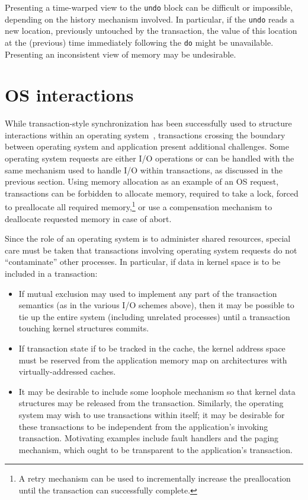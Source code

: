 Presenting a time-warped view to the \texttt{undo} block can be
difficult or impossible, depending on the history mechanism involved.
In particular, if the \texttt{undo} reads a new location, previously
untouched by the transaction, the value of this location at the
(previous) time immediately following the \texttt{do} might be
unavailable.  Presenting an inconsistent view of memory may be
undesirable.

\section{OS interactions}
While transaction-style synchronization has been successfully used to
structure interactions within an operating system~\cite{MassalinPu91},
transactions crossing the boundary between operating system and
application present additional challenges.  Some operating system
requests are either I/O operations or can be handled with the same
mechanism used to handle I/O within transactions, as discussed in the
previous section.  Using memory allocation as an example of an OS
request, transactions can be forbidden to allocate memory, required to
take a lock, forced to preallocate all required memory,\footnote{A
retry mechanism can be used to incrementally increase the
preallocation until the transaction can successfully complete.} or
use a compensation mechanism to deallocate requested memory in case of
abort.

Since the role of an operating system is to administer shared
resources, special care must be taken that transactions involving
operating system requests do not ``contaminate'' other processes.
In particular, if data in kernel space is to be included in a
transaction:
\begin{itemize}
\item If mutual exclusion may used to implement any part of the
transaction semantics (as in the various I/O schemes above), then it
may be possible to tie up the entire system (including unrelated
processes) until a transaction touching kernel structures commits.
\item If transaction state if to be tracked in the cache, the
kernel address space must be reserved from the application memory map
 on architectures with virtually-addressed caches.
\item It may be desirable to include some loophole mechanism
 so that kernel data structures may be released from the transaction.
 Similarly, the operating system may wish to use transactions within
 itself; it may be desirable for these transactions to be independent
 from the application's invoking transaction.  Motivating examples
 include fault handlers and the paging mechanism, which ought to be
 transparent to the application's transaction.  
\end{itemize}

